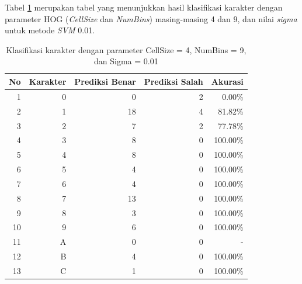 \noindent Tabel \ref{tab:hasilklasifikasisel4} merupakan tabel yang menunjukkan hasil klasifikasi karakter dengan parameter HOG (\textit{CellSize} dan \textit{NumBins}) masing-masing 4 dan 9, dan nilai \textit{sigma} untuk metode \textit{SVM} 0.01.

\begin{longtable}[c]{|r|r|r|r|r|}
	\caption{Klasifikasi karakter dengan parameter CellSize = 4, NumBins = 9, dan Sigma = 0.01}
	\label{tab:hasilklasifikasisel4}\\
	\hline
	\textbf{No} & \textbf{Karakter} & \textbf{Prediksi Benar} & \textbf{Prediksi Salah} & \textbf{Akurasi} \\ \hline
	\endhead
	1           & 0                 & 0                       & 2                       &0.00\%            \\ \hline
	2           & 1                 & 18                       & 4                       &81.82\%            \\ \hline
	3           & 2                 & 7                       & 2                       &77.78\%            \\ \hline
	4           & 3                 & 8                       & 0                       &100.00\%            \\ \hline
	5           & 4                 & 8                       & 0                       &100.00\%            \\ \hline
	6           & 5                 & 4                       & 0                       &100.00\%            \\ \hline
	7           & 6                 & 4                       & 0                       &100.00\%            \\ \hline
	8           & 7                 & 13                       & 0                       &100.00\%            \\ \hline
	9           & 8                 & 3                       & 0                       &100.00\%            \\ \hline
	10           & 9                 & 6                       & 0                       &100.00\%            \\ \hline
	11           & A                 & 0                       & 0                       & -            \\ \hline
	12           & B                 & 4                       & 0                       &100.00\%            \\ \hline
	13           & C                 & 1                       & 0                       &100.00\%            \\ \hline

\end{longtable}
